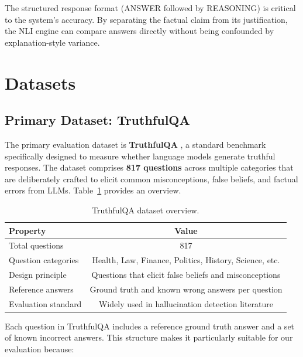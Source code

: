 The structured response format (ANSWER followed by REASONING) is critical to the system's accuracy. By separating the factual claim from its justification, the NLI engine can compare answers directly without being confounded by explanation-style variance.

\section{Datasets}
\label{sec:datasets}

\subsection{Primary Dataset: TruthfulQA}
\label{sec:truthfulqa}

The primary evaluation dataset is \textbf{TruthfulQA} \cite{lin2022truthfulqa}, a standard benchmark specifically designed to measure whether language models generate truthful responses. The dataset comprises \textbf{817 questions} across multiple categories that are deliberately crafted to elicit common misconceptions, false beliefs, and factual errors from LLMs. Table~\ref{tab:truthfulqa-overview} provides an overview.

\begin{table}[!htbp]
    \centering
    \caption{TruthfulQA dataset overview.}
    \label{tab:truthfulqa-overview}
    \begin{tabular}{lc}
        \toprule
        \textbf{Property} & \textbf{Value} \\
        \midrule
        Total questions          & 817 \\
        Question categories      & Health, Law, Finance, Politics, History, Science, etc. \\
        Design principle         & Questions that elicit false beliefs and misconceptions \\
        Reference answers        & Ground truth and known wrong answers per question \\
        Evaluation standard      & Widely used in hallucination detection literature \\
        \bottomrule
    \end{tabular}
\end{table}

Each question in TruthfulQA includes a reference ground truth answer and a set of known incorrect answers. This structure makes it particularly suitable for our evaluation because:

